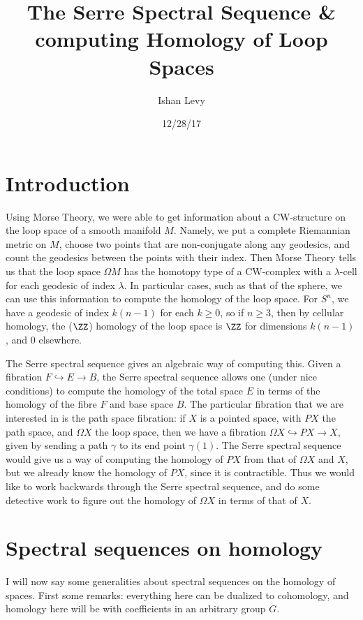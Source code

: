 \documentclass[12pt,oneside]{amsart}
\title{The Serre Spectral Sequence \& computing Homology of Loop Spaces}
\author{Ishan Levy}
\date{12/28/17}
\begin{document}
\maketitle
\section{Introduction}

Using Morse Theory, we were able to get information about a CW-structure on the loop space of a smooth manifold $M$. Namely, we put a complete Riemannian metric on $M$, choose two points that are non-conjugate along any geodesics, and count the geodesics between the points with their index. Then Morse Theory tells us that the loop space $\Omega M$ has the homotopy type of a CW-complex with a $\lambda$-cell for each geodesic of index $\lambda$. In particular cases, such as that of the sphere, we can use this information to compute the homology of the loop space. For $S^n$, we have a geodesic of index $k(n-1)$ for each $k\geq0$, so if $n\geq 3$, then by cellular homology, the ($\ZZ$) homology of the loop space is $\ZZ$ for dimensions $k(n-1)$, and $0$ elsewhere.

The Serre spectral sequence gives an algebraic way of computing this. Given a fibration $F \hookrightarrow E \to B$, the Serre spectral sequence allows one (under nice conditions) to compute the homology of the total space $E$ in terms of the homology of the fibre $F$ and base space $B$. The particular fibration that we are interested in is the path space fibration: if $X$ is a pointed space, with $PX$ the path space, and $\Omega X$ the loop space, then we have a fibration $\Omega X \hookrightarrow PX \to X$, given by sending a path $\gamma$ to its end point $\gamma(1)$. The Serre spectral sequence would give us a way of computing the homology of $PX$ from that of $\Omega X$ and $X$, but we already know the homology of $PX$, since it is contractible. Thus we would like to work backwards through the Serre spectral sequence, and do some detective work to figure out the homology of $\Omega X$ in terms of that of $X$.

\section{Spectral sequences on homology}

I will now say some generalities about spectral sequences on the homology of spaces. First some remarks: everything here can be dualized to cohomology, and homology here will be with coefficients in an arbitrary group $G$.
\end{document}
